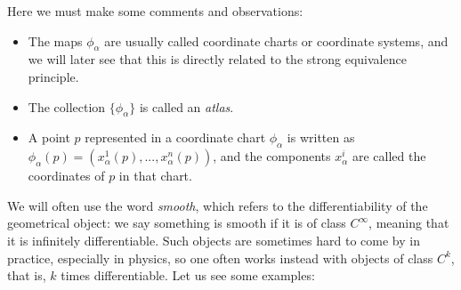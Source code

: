 \begin{enumerate}
        Here we must make some comments and observations:

        \begin{itemize}
            \item The maps $\phi_{\alpha}$ are usually called coordinate charts or coordinate systems, and we will later see that this is directly related to the strong equivalence principle.

            \item The collection $\{\phi_{\alpha}\}$ is called an \textit{atlas}.

            \item A point $p$ represented in a coordinate chart $\phi_{\alpha}$ is written as $\phi_{\alpha}(p) = \left(x_{\alpha}^1(p),...,x_{\alpha}^n(p)\right)$, and the components $x_{\alpha}^i$ are called the coordinates of $p$ in that chart.
        \end{itemize}
    \end{enumerate}

    We will often use the word \textit{smooth}, which refers to the differentiability of the geometrical object: we say something is smooth if it is of class $C^{\infty}$, meaning that it is infinitely differentiable. Such objects are sometimes hard to come by in practice, especially in physics, so one often works instead with objects of class $C^k$, that is, $k$ times differentiable. Let us see some examples:

